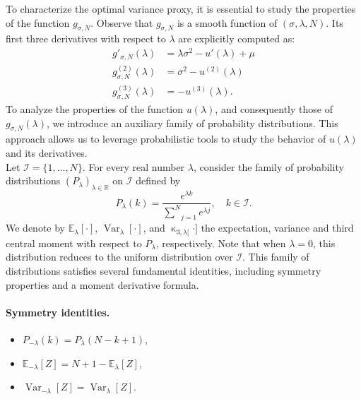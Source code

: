 \documentclass[a4paper, 10pt]{article}
\newcommand{\beq}{\begin{equation}}
\newcommand{\eeq}{\end{equation}}
\theoremstyle{definition}
\begin{document}
To characterize the optimal variance proxy, it is essential to study the properties of the function $g_{\sigma, N}$. Observe that $g_{\sigma, N}$ is a smooth function of $(\sigma, \lambda, N)$. Its first three derivatives with respect to $\lambda$ are explicitly computed as:
\begin{align*}
g'_{\sigma,N}(\lambda)   &= \lambda \sigma^2 - u'(\lambda) + \mu \\
g^{(2)}_{\sigma,N}(\lambda) &= \sigma^2 - u^{(2)}(\lambda)\\
g^{(3)}_{\sigma,N}(\lambda) &= - u^{(3)}(\lambda).
\end{align*}
To analyze the properties of the function \( u(\lambda) \), and consequently those of \( g_{\sigma,N}(\lambda) \), we introduce an auxiliary family of probability distributions. This approach allows us to leverage probabilistic tools to study the behavior of \( u(\lambda) \) and its derivatives.\\
Let \( \mathcal{I} = \{1, \ldots, N\} \). For every real number \( \lambda \), consider the family of probability distributions \( (P_\lambda)_{\lambda \in \mathbb{R}} \) on \( \mathcal{I} \) defined by
\beq
P_\lambda(k) = \frac{e^{\lambda k}}{\underset{j=1}{\overset{N}{\sum}}e^{\lambda j}}, \quad k \in \mathcal{I}.
\eeq
We denote by \( \mathbb{E}_\lambda[\cdot] \), \( \operatorname{Var}_\lambda[\cdot] \), and \( \operatorname{\kappa}_{3,\lambda[}\cdot] \) the expectation, variance and  third central moment with respect to \( P_\lambda \), respectively. Note that when \( \lambda = 0 \), this distribution reduces to the uniform distribution over \( \mathcal{I} \).
This family of distributions satisfies several fundamental identities, including symmetry properties and a moment derivative formula.
\paragraph{Symmetry identities.}
    \begin{itemize}
        \item \( P_{-\lambda}(k) = P_\lambda(N - k + 1) \),
        \item \( \mathbb{E}_{-\lambda}[Z] = N + 1 - \mathbb{E}_\lambda[Z] \),
        \item \( \operatorname{Var}_{-\lambda}[Z] = \operatorname{Var}_\lambda[Z] \).
    \end{itemize}
\end{document}
